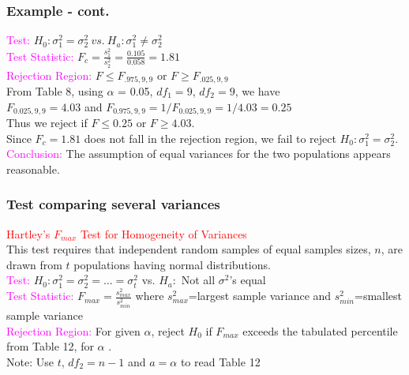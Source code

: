 \documentclass[xcolor=dvipsnames,12pt]{beamer}
\begin{document}
\begin{frame}
\frametitle{Example - cont.}
{\textcolor{magenta}{Test:}}  $H_0:\sigma_1^2 = \sigma_2^2\ vs.\   H_a:  \sigma_1^2 \neq \sigma_2^2$\\[.1in] 
{\textcolor{magenta}{Test Statistic:}}  $F_c=\frac{s_1^2}{s_2^2}=\frac{0.105}{0.058}=1.81$\\[.1in]  
{\textcolor{magenta}{Rejection Region:}} $F \leq F_{.975,9,9}$ or $F\geq F_{.025,9,9}$\\[.1in]
From Table 8, using $\alpha$ = 0.05, $df_1 = 9$, $df_2 = 9$, we have \\[.1in]
$F_{0.025,9,9} = 4.03$ and $F_{0.975,9,9} = 1/F_{0.025,9,9}= 1/4.03=0.25$\\[.1in]
Thus we reject if $F \leq 0.25$ or  $F\geq 4.03$. \\[.2in]
Since $F_c=1.81 $ does not fall in the rejection region, we fail to reject $ H_0:
\sigma_1^2 = \sigma_2^2$.\\[.1in] 
{\textcolor{magenta}{Conclusion:}} The assumption of equal
variances for the two populations appears reasonable.
\end{frame}

%
%
\begin{frame}
\frametitle{Test comparing several variances}
{\textcolor{red}{{Hartley's $F_{max}$} Test for Homogeneity
of Variances}}\\[.1in]
 This test requires that independent random samples of equal
samples sizes, $n$, are drawn from $t$  populations having normal distributions.\\[.1in]
{\textcolor{magenta}{Test:}}  $H_0: \sigma_1^2 = \sigma_2^2=\ldots= \sigma_t^2$ 
vs. $H_a:$ Not all $\sigma^2$'s equal\\[.1in]
{\textcolor{magenta}{Test Statistic:}} 
$F_{max} = \frac{s_{max}^2}{s_{min}^2} $  where  $s_{max}^2$=largest sample variance 
 and $s_{min}^2$=smallest sample variance\\[.1in]
{\textcolor{magenta}{Rejection Region:}} For given $\alpha$,
 reject $H_0$ if $F_{max}$ exceeds the tabulated
 percentile from Table 12, for $\alpha$ .\\[.1in]
Note: Use  $t$, $df_2 = n -1$ and $a=\alpha$ to read Table 12
\end{frame}
\end{document}
